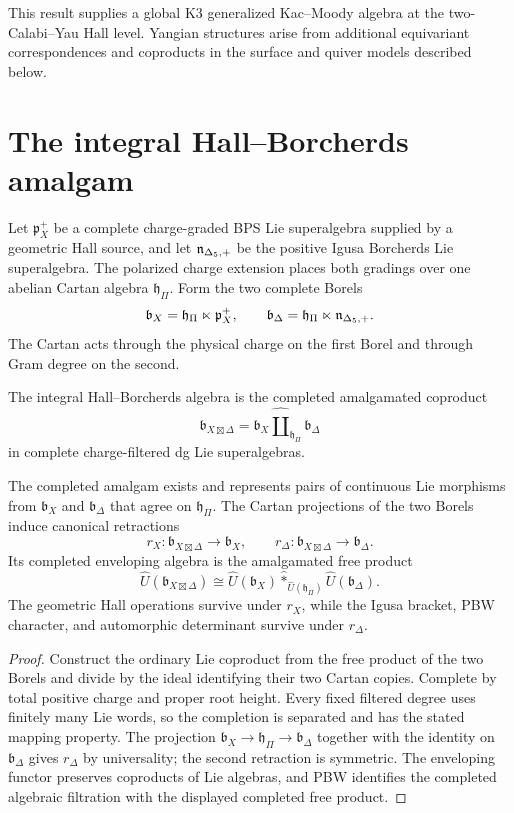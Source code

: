 This result supplies a global K3 generalized Kac--Moody algebra at the two-Calabi--Yau Hall level. Yangian structures arise from additional equivariant correspondences and coproducts in the surface and quiver models described below.

\chapter{The integral Hall--Borcherds amalgam}
Let $\mathfrak p_X^+$ be a complete charge-graded BPS Lie superalgebra supplied by a geometric Hall source, and let ${\mathfrak n_{\Delta_5,+}}$ be the positive Igusa Borcherds Lie superalgebra.  The polarized charge extension places both gradings over one abelian Cartan algebra $\mathfrak h_\Pi$.  Form the two complete Borels
\[
 \mathfrak b_X=\mathfrak h_\Pi\ltimes\mathfrak p_X^+,
 \qquad
 \mathfrak b_\Delta=\mathfrak h_\Pi\ltimes{\mathfrak n_{\Delta_5,+}}.
\]
The Cartan acts through the physical charge on the first Borel and through Gram degree on the second.

\begin{definition}
The integral Hall--Borcherds algebra is the completed amalgamated coproduct
\[
 \mathfrak b_{X\boxtimes\Delta}
 =\mathfrak b_X
  \widehat\amalg_{\mathfrak h_\Pi}
  \mathfrak b_\Delta
\]
in complete charge-filtered dg Lie superalgebras.
\end{definition}

\begin{theorem}
The completed amalgam exists and represents pairs of continuous Lie morphisms from $\mathfrak b_X$ and $\mathfrak b_\Delta$ that agree on $\mathfrak h_\Pi$.  The Cartan projections of the two Borels induce canonical retractions
\[
 r_X:\mathfrak b_{X\boxtimes\Delta}\longrightarrow\mathfrak b_X,
 \qquad
 r_\Delta:\mathfrak b_{X\boxtimes\Delta}\longrightarrow\mathfrak b_\Delta.
\]
Its completed enveloping algebra is the amalgamated free product
\[
 \widehat U(\mathfrak b_{X\boxtimes\Delta})
 \cong
 \widehat U(\mathfrak b_X)
 \widehat *_{\widehat U(\mathfrak h_\Pi)}
 \widehat U(\mathfrak b_\Delta).
\]
The geometric Hall operations survive under $r_X$, while the Igusa bracket, PBW character, and automorphic determinant survive under $r_\Delta$.
\end{theorem}
\begin{proof}
Construct the ordinary Lie coproduct from the free product of the two Borels and divide by the ideal identifying their two Cartan copies.  Complete by total positive charge and proper root height.  Every fixed filtered degree uses finitely many Lie words, so the completion is separated and has the stated mapping property.  The projection $\mathfrak b_X\to\mathfrak h_\Pi\to\mathfrak b_\Delta$ together with the identity on $\mathfrak b_\Delta$ gives $r_\Delta$ by universality; the second retraction is symmetric.  The enveloping functor preserves coproducts of Lie algebras, and PBW identifies the completed algebraic filtration with the displayed completed free product.
\end{proof}

